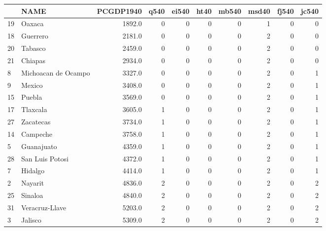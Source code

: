 \begin{tabular}{llrrrrrrrr}
\toprule
{} &                   NAME &  PCGDP1940 &  q540 &  ei540 &  ht40 &  mb540 &  msd40 &  fj540 &  jc540 \\
\midrule
19 &                 Oaxaca &     1892.0 &     0 &      0 &     0 &      0 &      1 &      0 &      0 \\
18 &               Guerrero &     2181.0 &     0 &      0 &     0 &      0 &      2 &      0 &      0 \\
20 &                Tabasco &     2459.0 &     0 &      0 &     0 &      0 &      2 &      0 &      0 \\
21 &                Chiapas &     2934.0 &     0 &      0 &     0 &      0 &      2 &      0 &      0 \\
8  &    Michoacan de Ocampo &     3327.0 &     0 &      0 &     0 &      0 &      2 &      0 &      1 \\
9  &                 Mexico &     3408.0 &     0 &      0 &     0 &      0 &      2 &      0 &      1 \\
15 &                 Puebla &     3569.0 &     0 &      0 &     0 &      0 &      2 &      0 &      1 \\
17 &               Tlaxcala &     3605.0 &     1 &      0 &     0 &      0 &      2 &      0 &      1 \\
27 &              Zacatecas &     3734.0 &     1 &      0 &     0 &      0 &      2 &      0 &      1 \\
14 &               Campeche &     3758.0 &     1 &      0 &     0 &      0 &      2 &      0 &      1 \\
5  &             Guanajuato &     4359.0 &     1 &      0 &     0 &      0 &      2 &      0 &      1 \\
28 &        San Luis Potosi &     4372.0 &     1 &      0 &     0 &      0 &      2 &      0 &      1 \\
7  &                Hidalgo &     4414.0 &     1 &      0 &     0 &      0 &      2 &      0 &      1 \\
2  &                Nayarit &     4836.0 &     2 &      0 &     0 &      0 &      2 &      0 &      2 \\
25 &                Sinaloa &     4840.0 &     2 &      0 &     0 &      0 &      2 &      0 &      2 \\
31 &         Veracruz-Llave &     5203.0 &     2 &      0 &     0 &      0 &      2 &      0 &      2 \\
3  &                Jalisco &     5309.0 &     2 &      0 &     0 &      0 &      2 &      0 &      2 \\

\end{tabular}

